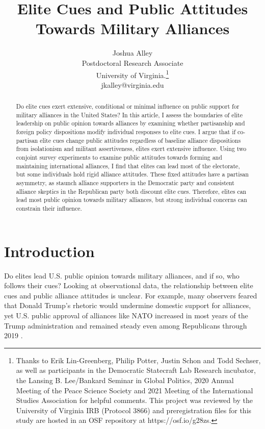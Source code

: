 \documentclass[12pt]{article}
\title{\textbf{Elite Cues and Public Attitudes Towards Military Alliances}}
\author{Joshua Alley \\
Postdoctoral Research Associate \\
University of Virginia.\thanks{Thanks to Erik Lin-Greenberg, Philip Potter, Justin Schon and Todd Sechser, as well as participants in the Democratic Statecraft Lab Research incubator, the Lansing B. Lee/Bankard Seminar in Global Politics, 2020 Annual Meeting of the Peace Science Society and 2021 Meeting of the International Studies Association for helpful comments. 
This project was reviewed by the University of Virginia IRB (Protocol 3866) and preregistration files for this study are hosted in an OSF repository at https://osf.io/g28zs.} \\
jkalley@virginia.edu
}
\date{}
\begin{document}
\maketitle 

\doublespace 

\begin{abstract}
Do elite cues exert extensive, conditional or minimal influence on public support for military alliances in the United States? 
In this article, I assess the boundaries of elite leadership on public opinion towards alliances by examining whether partisanship and foreign policy dispositions modify individual responses to elite cues.
I argue that if co-partisan elite cues change public attitudes regardless of baseline alliance dispositions from isolationism and militant assertiveness, elites exert extensive influence. 
Using two conjoint survey experiments to examine public attitudes towards forming and maintaining international alliances, I find that elites can lead most of the electorate, but some individuals hold rigid alliance attitudes. 
These fixed attitudes have a partisan asymmetry, as staunch alliance supporters in the Democratic party and consistent alliance skeptics in the Republican party both discount elite cues.  
Therefore, elites can lead most public opinion towards military alliances, but strong individual concerns can constrain their influence.  
\end{abstract}


\newpage 


\section{Introduction}


Do elites lead U.S. public opinion towards military alliances, and if so, who follows their cues?
Looking at observational data, the relationship between elite cues and public alliance attitudes is unclear.
For example, many observers feared that Donald Trump's rhetoric would undermine domestic support for alliances, yet U.S. public approval of alliances like NATO increased in most years of the Trump administration and remained steady even among Republicans through 2019 \citep{PewNATO2020}.
\end{document}
